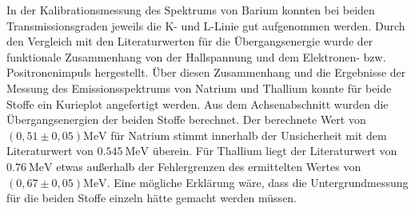 In der Kalibrationsmessung des Spektrums von Barium konnten bei beiden Transmissionsgraden jeweils die K- und L-Linie gut aufgenommen werden. Durch den Vergleich mit den Literaturwerten für die Übergangsenergie wurde der funktionale Zusammenhang von der Hallspannung und dem Elektronen- bzw. Positronenimpuls hergestellt. Über diesen Zusammenhang und die Ergebnisse der Messung des Emissionsspektrums von Natrium und Thallium konnte für beide Stoffe ein Kurieplot angefertigt werden. Aus dem Achsenabschnitt wurden die Übergangsenergien der beiden Stoffe berechnet. Der berechnete Wert von $\si{(0,51 \pm 0,05)\mega\eV}$ für Natrium stimmt innerhalb der Unsicherheit mit dem Literaturwert von $\SI{0,545}{\mega\eV}$\cite{naenergy} überein. Für Thallium liegt der Literaturwert von $\SI{0,76}{\mega\eV}$\cite{tlenergy} etwas außerhalb der Fehlergrenzen des ermittelten Wertes von $\si{(0,67 \pm 0,05)\mega\eV}$. Eine mögliche Erklärung wäre, dass die Untergrundmessung für die beiden Stoffe einzeln hätte gemacht werden müssen. 
